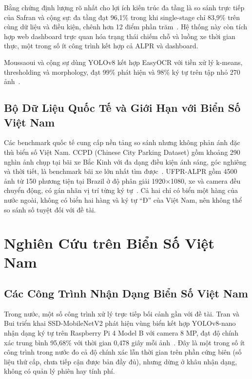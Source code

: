 Bằng chứng định lượng rõ nhất cho lợi ích kiến trúc đa tầng là so sánh trực tiếp của
Safran và cộng sự: đa tầng đạt 96,1\% trong khi single-stage chỉ 83,9\% trên cùng dữ liệu
và điều kiện, chênh hơn 12 điểm phần trăm~\autocite{safran2024multistage}. Hệ thống này
còn tích hợp web dashboard trực quan hóa trạng thái chiếm chỗ và luồng xe thời gian thực,
một trong số ít công trình kết hợp cả ALPR và dashboard.

Moussaoui và cộng sự dùng YOLOv8 kết hợp EasyOCR với tiền xử lý k-means, thresholding và
morphology, đạt 99\% phát hiện và 98\% ký tự trên tập nhỏ 270
ảnh~\autocite{moussaoui2024yolov8ocr}.

\subsection{Bộ Dữ Liệu Quốc Tế và Giới Hạn với Biển Số Việt Nam}

Các benchmark quốc tế cung cấp nền tảng so sánh nhưng không phản ánh đặc thù biển số Việt
Nam. CCPD (Chinese City Parking Dataset) gồm khoảng 290 nghìn ảnh chụp tại bãi xe Bắc
Kinh với đa dạng điều kiện ánh sáng, góc nghiêng và thời tiết, là benchmark bãi xe lớn
nhất tìm được~\autocite{xu2018ccpd}. UFPR-ALPR gồm 4500 ảnh từ 150 phương tiện tại Brazil
ở độ phân giải 1920×1080, xe và camera đều chuyển động, có gán nhãn vị trí từng ký
tự~\autocite{laroca2018ufpr}. Cả hai chỉ có biển một hàng của nước ngoài, không
có biển hai hàng và ký tự ``Đ'' của Việt Nam, nên không thể so sánh số tuyệt đối với đề
tài.

\section{Nghiên Cứu trên Biển Số Việt Nam}

\subsection{Các Công Trình Nhận Dạng Biển Số Việt Nam}

Trong nước, một số công trình xử lý trực tiếp bối cảnh gần với đề tài. Tran và Bui triển
khai SSD-MobileNetV2 phát hiện vùng biển kết hợp YOLOv8-nano nhận dạng ký tự trên
Raspberry Pi 4 Model B với camera 8 MP, đạt độ chính xác trung bình 95,68\% với thời gian
0,478 giây mỗi ảnh~\autocite{tran2025vietnamlpr}. Đây là một trong số ít công trình trong
nước đo cả độ chính xác lẫn thời gian trên phần cứng biên (số liệu thứ cấp, chưa tiếp cận
được bản đầy đủ), nhưng dừng ở khâu nhận dạng, không có quản lý phiên hay tính phí.

